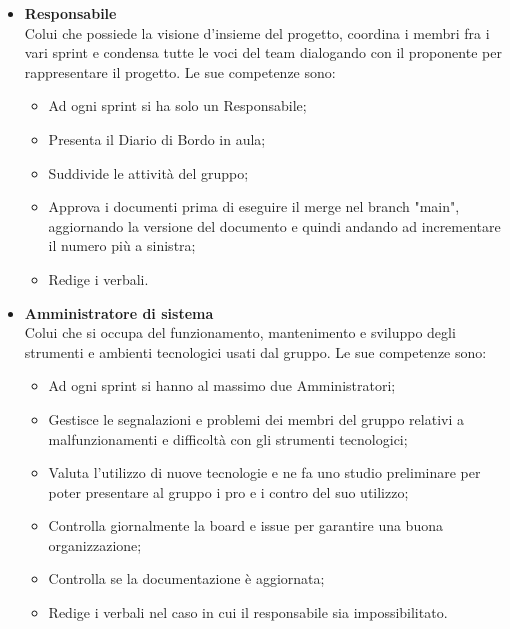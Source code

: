             \begin{itemize}
                \item \textbf{Responsabile}\\
                Colui che possiede la visione d'insieme del progetto, coordina i membri fra i vari sprint e condensa tutte le voci del team
                dialogando con il proponente per rappresentare il progetto.
                Le sue competenze sono:
                \begin{itemize}
                    \item Ad ogni sprint si ha solo un Responsabile;
                    \item Presenta il Diario di Bordo in aula;
                    \item Suddivide le attività del gruppo;
                    \item Approva i documenti prima di eseguire il merge nel branch "main", aggiornando la versione del documento e quindi andando ad incrementare il numero più a sinistra;
                    \item Redige i verbali.
                \end{itemize}
                \item \textbf{Amministratore di sistema}\\
                Colui che si occupa del funzionamento, mantenimento e sviluppo degli strumenti e ambienti tecnologici
                usati dal gruppo.
                Le sue competenze sono:
                \begin{itemize}
                    \item Ad ogni sprint si hanno al massimo due Amministratori;
                    \item Gestisce le segnalazioni e problemi dei membri del gruppo relativi a malfunzionamenti e difficoltà con gli strumenti tecnologici;
                    \item Valuta l'utilizzo di nuove tecnologie e ne fa uno studio preliminare per poter presentare al
                        gruppo i pro e i contro del suo utilizzo;
                    \item Controlla giornalmente la board e issue per garantire una buona organizzazione;
                    \item Controlla se la documentazione è aggiornata;
                    \item Redige i verbali nel caso in cui il responsabile sia impossibilitato.
                    \end{itemize}

\end{itemize}
